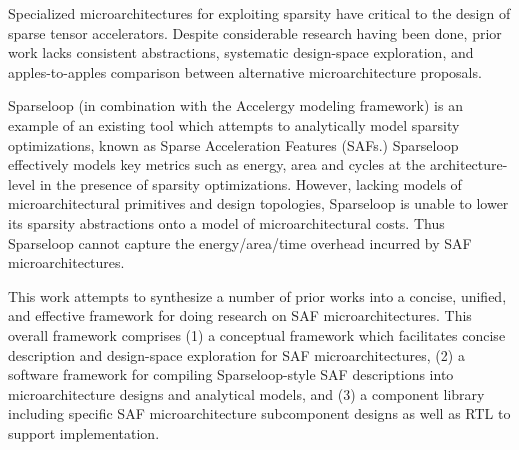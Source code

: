 % 
% 
%


Specialized microarchitectures for exploiting sparsity have critical to the design of sparse tensor accelerators. Despite considerable research having been done, prior work lacks consistent abstractions, systematic design-space exploration, and apples-to-apples comparison between alternative microarchitecture proposals.

Sparseloop (in combination with the Accelergy modeling framework) is an example of an existing tool which attempts to analytically model sparsity optimizations, known as Sparse Acceleration Features (SAFs.) Sparseloop effectively models key metrics such as energy, area and cycles at the architecture-level in the presence of sparsity optimizations. However, lacking models of microarchitectural primitives and design topologies, Sparseloop is unable to lower its sparsity abstractions onto a model of microarchitectural costs. Thus Sparseloop cannot capture the energy/area/time overhead incurred by SAF microarchitectures.

This work attempts to synthesize a number of prior works into a concise, unified, and effective framework for doing research on SAF microarchitectures. This overall framework comprises (1) a conceptual framework which facilitates concise description and design-space exploration for SAF microarchitectures, (2) a software framework for compiling Sparseloop-style SAF descriptions into microarchitecture designs and analytical models, and (3) a component library including specific SAF microarchitecture subcomponent designs as well as RTL to support implementation. 